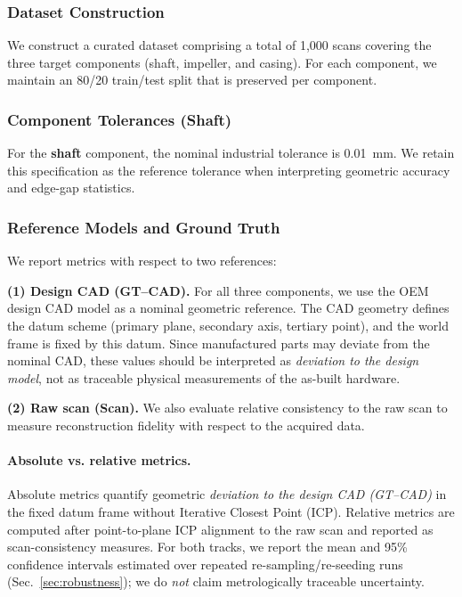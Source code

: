 \documentclass{ieeeaccess}
\begin{document}
\subsubsection{Dataset Construction}
We construct a curated dataset comprising a total of 1,000 scans covering the three target components (shaft, impeller, and casing). For each component, we maintain an 80/20 train/test split that is preserved per component.

\subsubsection{Component Tolerances (Shaft)}
For the \textbf{shaft} component, the nominal industrial tolerance is
\SI{0.01}{\milli\meter}. We retain this specification as the reference
tolerance when interpreting geometric accuracy and edge-gap statistics.

\subsubsection{Reference Models and Ground Truth}
\label{sec:gt}

We report metrics with respect to two references:

\noindent\textbf{(1) Design CAD (GT--CAD).}
For all three components, we use the OEM design CAD model as a nominal geometric reference. The CAD geometry defines the datum scheme (primary plane, secondary axis, tertiary point), and the world frame is fixed by this datum. Since manufactured parts may deviate from the nominal CAD, these values should be interpreted as \emph{deviation to the design model}, not as traceable physical measurements of the as-built hardware.

\noindent\textbf{(2) Raw scan (Scan).}
We also evaluate relative consistency to the raw scan to measure reconstruction fidelity with respect to the acquired data.

\paragraph*{Absolute vs. relative metrics.}
Absolute metrics quantify geometric \emph{deviation to the design CAD (GT--CAD)} in the fixed datum frame without Iterative Closest Point (ICP). Relative metrics are computed after point-to-plane ICP alignment to the raw scan and reported as scan-consistency measures. For both tracks, we report the mean and 95\% confidence intervals estimated over repeated re-sampling/re-seeding runs (Sec.~\ref{sec:robustness}); we do \emph{not} claim metrologically traceable uncertainty.
\end{document}
